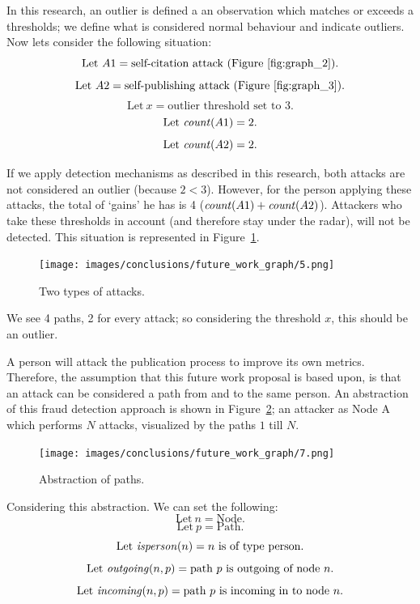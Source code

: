 \documentclass{ou-report}
\begin{document}
\newcommand{\ewcount}{\mi{count}}

In this research, an outlier is defined a an observation which matches or 
exceeds a thresholds; we define what is considered normal behaviour and 
indicate outliers. Now lets consider the following situation:
\[ \text{Let}\ A1=\text{self-citation attack (Figure~\ref{fig:graph_2})}. \] 
\[ \text{Let}\ A2=\text{self-publishing attack (Figure~\ref{fig:graph_3})}. \] 
\[ \text{Let}\ x=\text{outlier threshold set to 3}. \]
\[ \text{Let}\ \ewcount(A1)=2. \]
\[ \text{Let}\ \ewcount(A2)=2. \]

If we apply detection mechanisms as described in this research, both attacks 
are not considered an outlier (because $2 < 3$).
However, for the person applying these attacks, the total of `gains' he has
is 4 ($\ewcount(A1) + \ewcount(A2)$). Attackers who take these thresholds in 
account (and therefore stay under the radar), will not be detected. This 
situation is represented in Figure~\ref{fig:graph_5}.

\begin{figure}[H]
    \centering
    \texttt{[image: images/conclusions/future\_work\_graph/5.png]}
    \caption{Two types of attacks.}
    \label{fig:graph_5}
\end{figure}

We see 4 paths, 2 for every attack; so considering the threshold $x$, this 
should be an outlier. 

A person will attack the publication process to improve its own metrics.
Therefore, the assumption that this future work proposal is based upon, is
that an attack can be considered a path from and to the 
same person.
An abstraction of this fraud detection approach is shown in 
Figure~\ref{fig:graph_7}; an attacker as Node A which performs $N$
attacks, visualized by the paths $1$ till $N$.

\begin{figure}[H]
    \centering
    \texttt{[image: images/conclusions/future\_work\_graph/7.png]}
    \caption{Abstraction of paths.}
    \label{fig:graph_7}
\end{figure}

\newcommand{\incoming}{\mi{incoming}}
\newcommand{\outgoing}{\mi{outgoing}}
\newcommand{\isperson}{\mi{isperson}}
\newcommand{\isaffiliation}{\mi{isaffiliation}}
\newcommand{\isjournal}{\mi{isjournal}}

Considering this abstraction. We can set the following:
\[ \text{Let}\ n=\text{Node}. \] 
\[ \text{Let}\ p=\text{Path}. \]
\[ \text{Let}\ \isperson(n)=n\text{ is of type person.} \]
\[ \text{Let}\ \outgoing(n, p)=\text{path }p\text{ is outgoing of node }n\text{.} \]
\[ \text{Let}\ \incoming(n, p)=\text{path }p\text{ is incoming in to node }n\text{.} \]
\end{document}
